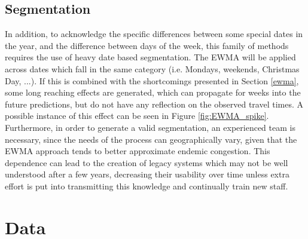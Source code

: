 \documentclass[letterpaper, 10 pt, conference]{ieeeconf}  %
\begin{document}
\subsection{Segmentation}\label{segmentation}
In addition, to acknowledge the specific differences between some special dates in the year, and the difference between days of the week, this family of methods requires the use of heavy date based segmentation. 
The EWMA will be applied across dates which fall in the same category (i.e. Mondays, weekends, Christmas Day, ...).
If this is combined with the shortcomings presented in Section \ref{ewma}, some long reaching effects are generated, which can propagate for weeks into the future predictions, but do not have any reflection on the observed travel times. A possible instance of this effect can be seen in Figure \ref{fig:EWMA_spike}.
Furthermore, in order to generate a valid segmentation, an experienced team is necessary, since the needs of the process can geographically vary, given that the EWMA approach tends to better approximate endemic congestion. 
This dependence can lead to the creation of legacy systems which may not be well understood after a few years, decreasing their usability over time unless extra effort is put into transmitting this knowledge and continually train new staff.
\section{Data}
\end{document}
